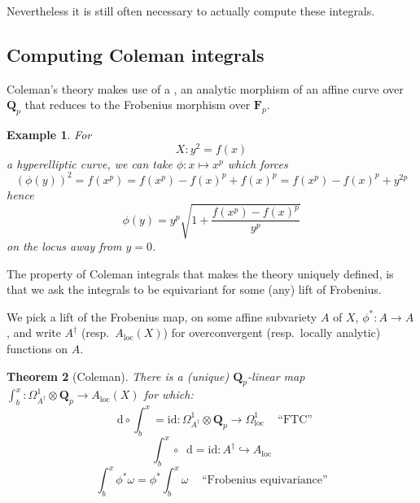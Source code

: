 \documentclass[oneside,11pt,]{article}
\newtheorem{theorem}{Theorem}
\newtheorem{example}[theorem]{Example}
\newcommand{\diff}{\mathop{}\!\mathrm{d}}
\newcommand{\ZZ}{\mathbf{Z}}
\newcommand{\QQ}{\mathbf{Q}}
\let\emph\relax %
\begin{document}
Nevertheless it is still often necessary to actually compute these integrals.

\subsection{Computing Coleman integrals}
Coleman's theory makes use of a \emph{lift of Frobenius}, an analytic morphism of an affine curve over $\mathbf Q_p$ that reduces to the Frobenius morphism over $\mathbf F_p$.
\begin{example}
    For \[X \colon  y^2 = f(x)\] a hyperelliptic curve, we can take
    \(\phi \colon x \mapsto x^p\)
    which forces
    \[ (\phi (y))^2 = f (x^p) = f(x^p) - f(x)^p + f(x)^p = f(x^p) - f(x)^p + y^{2p}\]
    hence
    \[ \phi (y) = y^p\sqrt{1 + \frac{f(x^p) - f(x)^p}{y^p}}\]
    on the locus away from $y = 0$.
\end{example}

The property of Coleman integrals that makes the theory uniquely defined, is that we ask the integrals to be equivariant for some (any) lift of Frobenius.


    We pick a lift of the Frobenius map, on some affine subvariety $A$ of $X$, \(\phi^*\colon A \to A\), and write \(A^\dagger\) (resp.\ \(A_{\text{loc}}(X)\)) for overconvergent (resp.\ locally analytic) functions on \(A\).
    \begin{theorem}[{Coleman}]
        There is a (unique) \(\QQ_p\)-linear map \(\int_b^x\colon \Omega_{A^\dagger}^1\otimes \QQ_p \to A_\mathrm{loc} (X)\) for which:\leavevmode%
        \[\diff \circ \int_b^x = \mathrm{id}\colon \Omega_{A^\dagger}^1\otimes \QQ_p \to \Omega_{\text{loc}}^1\,\quad\text{``FTC''}\]%
        \[\int_b^x\circ\diff = \mathrm{id}\colon A^\dagger \hookrightarrow A_{\mathrm{loc}}\]%
        \[\int_b^x \phi^*\omega = \phi^*\int_b^x \omega\,\quad\text{``Frobenius equivariance''}\]%
    \end{theorem}
\end{document}
